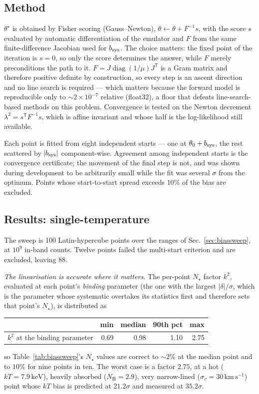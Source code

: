 \documentclass[11pt,a4paper]{article}
\newcommand{\nh}{N_{\mathrm{H}}}
\newcommand{\kev}{\,\mathrm{keV}}
\newcommand{\kms}{\,\mathrm{km\,s^{-1}}}
\begin{document}
\subsection{Method}
$\theta^\star$ is obtained by Fisher scoring (Gauss--Newton),
$\theta\leftarrow\theta+F^{-1}s$, with the score $s$ evaluated by automatic
differentiation of the emulator and $F$ from the same finite-difference
Jacobian used for $b_{\rm sys}$. The choice matters: the fixed point of the
iteration is $s=0$, so only the score determines the answer, while $F$ merely
preconditions the path to it. $F=J\operatorname{diag}(1/\mu)J^{\mathsf T}$ is a
Gram matrix and therefore positive definite by construction, so every step is
an ascent direction and no line search is required --- which matters because
the forward model is reproducible only to ${\sim}2\times10^{-7}$ relative
(float32), a floor that defeats line-search-based methods on this problem.
Convergence is tested on the Newton decrement $\lambda^2=s^{\mathsf T}F^{-1}s$,
which is affine invariant and whose half is the log-likelihood still available.

Each point is fitted from eight independent starts --- one at
$\theta_0+b_{\rm sys}$, the rest scattered by $|b_{\rm sys}|$ component-wise.
Agreement among independent starts is the convergence certificate; the
movement of the final step is not, and was shown during development to be
arbitrarily small while the fit was several $\sigma$ from the optimum. Points
whose start-to-start spread exceeds $10\%$ of the bias are excluded.

\subsection{Results: single-temperature}
The sweep is 100 Latin-hypercube points over the ranges of
Sec.~\ref{sec:biassweep}, at $10^9$ in-band counts. Twelve points failed the
multi-start criterion and are excluded, leaving 88.

\emph{The linearisation is accurate where it matters.} The per-point $N_\star$
factor $k^2$, evaluated at each point's \emph{binding} parameter (the one with
the largest $|\delta|/\sigma$, which is the parameter whose systematic
overtakes its statistics first and therefore sets that point's $N_\star$), is
distributed as
\begin{center}
\begin{tabular}{lrrrr}
\toprule
& min & median & 90th pct & max \\
\midrule
$k^2$ at the binding parameter & 0.69 & 0.98 & 1.10 & 2.75 \\
\bottomrule
\end{tabular}
\end{center}
\noindent so Table~\ref{tab:biassweep}'s $N_\star$ values are correct to
${\sim}2\%$ at the median point and to $10\%$ for nine points in ten. The worst
case is a factor $2.75$, at a hot ($kT=7.9\kev$), heavily absorbed
($\nh=2.9$), very narrow-lined ($\sigma_v=30\kms$) point whose $kT$ bias is
predicted at $21.2\sigma$ and measured at $35.2\sigma$.
\end{document}
